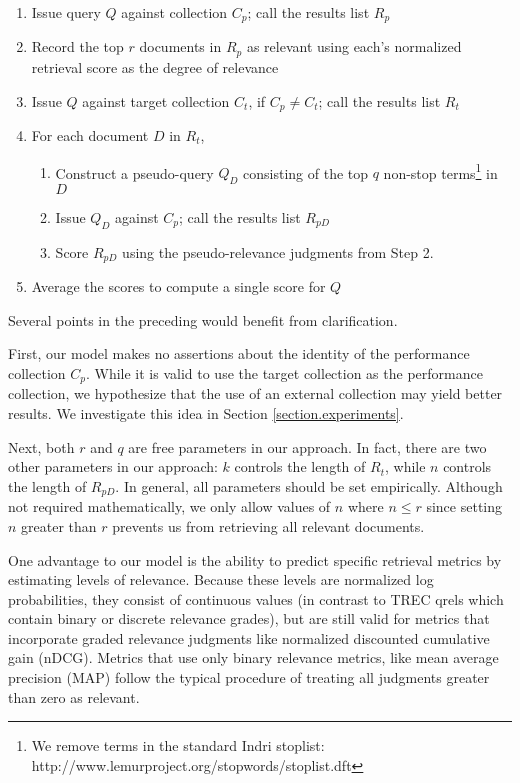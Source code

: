 \documentclass{sig-alternate}
\begin{document}
\begin{enumerate}
	\item Issue query $Q$ against collection $C_p$; call the results list $R_p$
	\item Record the top $r$ documents in $R_p$ as relevant using each's normalized retrieval score as the degree of relevance
	\item Issue $Q$ against target collection $C_t$, if $C_p \neq C_t$; call the results list $R_t$
	\item For each document $D$ in $R_t$,
	\begin{enumerate}
		\item Construct a pseudo-query $Q_D$ consisting of the top $q$ non-stop terms\footnote{We remove terms in the standard Indri stoplist: http://www.lemurproject.org/stopwords/stoplist.dft} in $D$
		\item Issue $Q_D$ against $C_p$; call the results list $R_{pD}$
		\item Score $R_{pD}$ using the pseudo-relevance judgments from Step 2.
	\end{enumerate}
	\item Average the scores to compute a single score for $Q$
\end{enumerate}

\noindent Several points in the preceding would benefit from clarification.

First, our model makes no assertions about the identity of the performance collection $C_p$. While it is valid to use the target collection as the performance collection, we hypothesize that the use of an external collection may yield better results. We investigate this idea in Section \ref{section.experiments}.

Next, both $r$ and $q$ are free parameters in our approach. In fact, there are two other parameters in our approach: $k$ controls the length of $R_t$, while $n$ controls the length of $R_{pD}$. In general, all parameters should be set empirically. Although not required mathematically, we only allow values of $n$ where $n \leq r$ since setting $n$ greater than $r$ prevents us from retrieving all relevant documents.

One advantage to our model is the ability to predict specific retrieval metrics by estimating levels of relevance. Because these levels are normalized log probabilities, they consist of continuous values (in contrast to TREC qrels which contain binary or discrete relevance grades), but are still valid for metrics that incorporate graded relevance judgments like normalized discounted cumulative gain (nDCG). Metrics that use only binary relevance metrics, like mean average precision (MAP) follow the typical procedure of treating all judgments greater than zero as relevant. 
\end{document}
